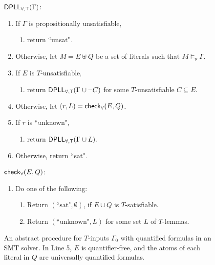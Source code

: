 \documentclass[oribibl]{llncs}
\begin{document}
\begin{figure}[t]
\begin{framed}
\begin{internallinenumbers}
$\small\mathsf{DPLL_{\forall, T}}( \Gamma )$:
\begin{enumerate}
\item[\ ] If $\Gamma$ is propositionally unsatisfiable,
\begin{enumerate}
\item[\ ] return ``unsat".
\end{enumerate}
\item[\ ] Otherwise, let $M = E \uplus Q$ be a set of literals such that $M \models_p \Gamma$.
\item[\ ] If $E$ is $T$-unsatisfiable,
\begin{enumerate}
\item[\ ] return $\small\mathsf{DPLL_{\forall, T}}( \Gamma \cup \neg C )$ for some $T$-unsatisfiable $C \subseteq E$.
\end{enumerate}
\item[\ ] Otherwise, let $( r, L ) = \small\mathsf{check}_\forall( E, Q )$.
\item[\ ] If $r$ is ``unknown",
\begin{enumerate}
\item[\ ] return $\small\mathsf{DPLL_{\forall, T}}( \Gamma \cup L )$.
\end{enumerate}
\item[\ ] Otherwise, return ``sat".
\end{enumerate}
$\small\mathsf{check}_\forall( E, Q )$:
\begin{enumerate}
\item[\ ] Do one of the following:
\begin{enumerate}
\item[\ ] Return $( \text{``sat"}, \emptyset )$, if $E \cup Q$ is $T$-satisfiable.
\item[\ ] Return $( \text{``unknown"}, L )$ for some set $L$ of $T$-lemmas.
\end{enumerate}
\end{enumerate}
\end{internallinenumbers}
\end{framed}
\vspace{-2ex}
\caption{An abstract procedure for $T$-inputs $\Gamma_0$ with quantified formulas in an SMT solver.
In Line 5, $E$ is quantifier-free, and the atoms of each literal in $Q$ are universally quantified formulas.
\label{fig:smtq}}
\end{figure}
\end{document}
